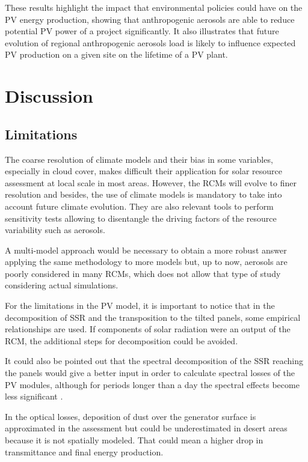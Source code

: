 These results highlight the impact that environmental policies could have on the PV energy production, showing that anthropogenic aerosols are able to reduce potential PV power of a project significantly. It also illustrates that future evolution of regional anthropogenic aerosols load is likely to influence expected PV production on a given site on the lifetime of a PV plant.

\section{Discussion}

\subsection{Limitations}

The coarse resolution of climate models and their bias in some variables, especially in cloud cover, makes difficult their application for solar resource assessment at local scale in most areas. However, the RCMs will evolve to finer resolution and besides, the use of climate models is mandatory to take into account future climate evolution. They are also relevant tools to perform sensitivity tests allowing to disentangle the driving factors of the resource variability such as aerosols. 

A multi-model approach would be necessary to obtain a more robust answer applying the same methodology to more models but, up to now, aerosols are poorly considered in many RCMs, which does not allow that type of study considering actual simulations. 

For the limitations in the PV model, it is important to notice that in the decomposition of SSR and the transposition to the tilted panels, some empirical relationships are used. If components of solar radiation were an output of the RCM, the additional steps for decomposition could be avoided.

It could also be pointed out that the spectral decomposition of the SSR reaching the panels would give a better input in order to calculate spectral losses of the PV modules, although for periods longer than a day the spectral effects become less significant \cite*{Martin2001}.

In the optical losses, deposition of dust over the generator surface is approximated in the assessment but could be underestimated in desert areas because it is not spatially modeled. That could mean a higher drop in transmittance and final energy production.

